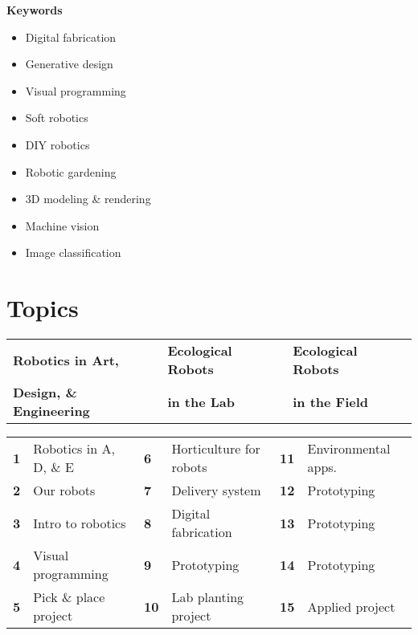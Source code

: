 \documentclass[11pt,article,oneside]{memoir}
\begin{document}
\noindent\textbf{Keywords}
\begin{multicols}{3}
\raggedright
\small
\begin{itemize}
\item Digital fabrication
\item Generative design
\item Visual programming
\item Soft robotics
\item DIY robotics
\item Robotic gardening
\item 3D modeling \& rendering
\item Machine vision
\item Image classification
\end{itemize}
\end{multicols}

\section{Topics}
%
\begin{table}[H]
\begin{tabular}{l @{\hskip 0.7cm} l @{\hskip 2.1cm} l}
\textbf{Robotics in Art,} & \textbf{Ecological Robots} & \textbf{Ecological Robots}\\
\textbf{Design, \& Engineering} & \textbf{in the Lab} & \textbf{in the Field}\\
\end{tabular}
\end{table}
%
\vspace*{-1em}
%
\begin{table}[H]
\begin{tabular}{l l l l l l}
\small
\textbf{1} & Robotics in A, D, \& E & \textbf{6} & Horticulture for robots & \textbf{11} & Environmental apps.\\
\textbf{2} & Our robots & \textbf{7} & Delivery system & \textbf{12} & Prototyping\\
\textbf{3} & Intro to robotics & \textbf{8} & Digital fabrication & \textbf{13} & Prototyping\\
\textbf{4} & Visual programming & \textbf{9} & Prototyping & \textbf{14} & Prototyping\\
\textbf{5} & Pick \& place project & \textbf{10} & Lab planting project & \textbf{15} & Applied project\\
\end{tabular}
\end{table}
%
\end{document}

